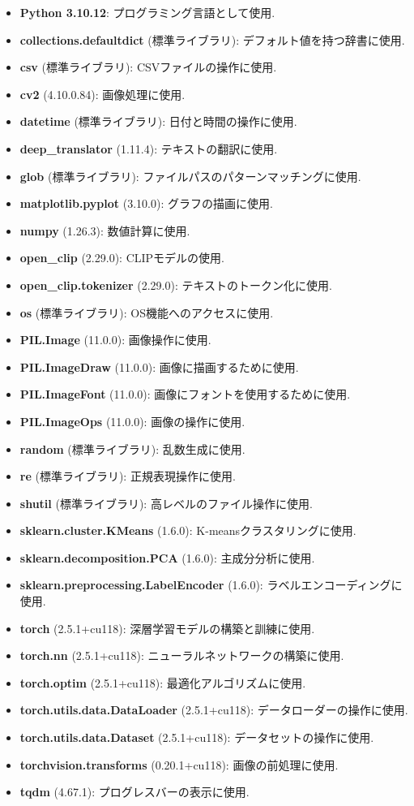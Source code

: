 \documentclass[a4paper, 12pt]{report}
\begin{document}
\begin{itemize}
    \item \textbf{Python 3.10.12}: プログラミング言語として使用. 
    \item \textbf{collections.defaultdict} (標準ライブラリ): デフォルト値を持つ辞書に使用. 
    \item \textbf{csv} (標準ライブラリ): CSVファイルの操作に使用. 
    \item \textbf{cv2} (4.10.0.84): 画像処理に使用. 
    \item \textbf{datetime} (標準ライブラリ): 日付と時間の操作に使用. 
    \item \textbf{deep\_translator} (1.11.4): テキストの翻訳に使用. 
    \item \textbf{glob} (標準ライブラリ): ファイルパスのパターンマッチングに使用. 
    \item \textbf{matplotlib.pyplot} (3.10.0): グラフの描画に使用. 
    \item \textbf{numpy} (1.26.3): 数値計算に使用. 
    \item \textbf{open\_clip} (2.29.0): CLIPモデルの使用. 
    \item \textbf{open\_clip.tokenizer} (2.29.0): テキストのトークン化に使用. 
    \item \textbf{os} (標準ライブラリ): OS機能へのアクセスに使用. 
    \item \textbf{PIL.Image} (11.0.0): 画像操作に使用. 
    \item \textbf{PIL.ImageDraw} (11.0.0): 画像に描画するために使用. 
    \item \textbf{PIL.ImageFont} (11.0.0): 画像にフォントを使用するために使用. 
    \item \textbf{PIL.ImageOps} (11.0.0): 画像の操作に使用. 
    \item \textbf{random} (標準ライブラリ): 乱数生成に使用. 
    \item \textbf{re} (標準ライブラリ): 正規表現操作に使用. 
    \item \textbf{shutil} (標準ライブラリ): 高レベルのファイル操作に使用. 
    \item \textbf{sklearn.cluster.KMeans} (1.6.0): K-meansクラスタリングに使用. 
    \item \textbf{sklearn.decomposition.PCA} (1.6.0): 主成分分析に使用. 
    \item \textbf{sklearn.preprocessing.LabelEncoder} (1.6.0): ラベルエンコーディングに使用. 
    \item \textbf{torch} (2.5.1+cu118): 深層学習モデルの構築と訓練に使用. 
    \item \textbf{torch.nn} (2.5.1+cu118): ニューラルネットワークの構築に使用. 
    \item \textbf{torch.optim} (2.5.1+cu118): 最適化アルゴリズムに使用. 
    \item \textbf{torch.utils.data.DataLoader} (2.5.1+cu118): データローダーの操作に使用. 
    \item \textbf{torch.utils.data.Dataset} (2.5.1+cu118): データセットの操作に使用. 
    \item \textbf{torchvision.transforms} (0.20.1+cu118): 画像の前処理に使用. 
    \item \textbf{tqdm} (4.67.1): プログレスバーの表示に使用. 
\end{itemize}
\end{document}
